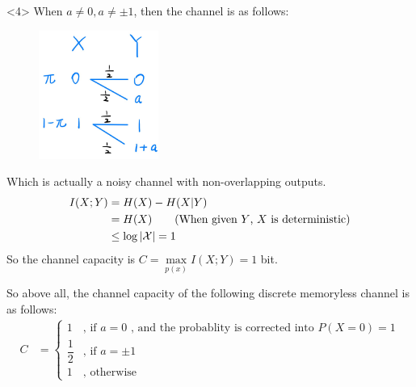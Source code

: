 <4> When $a \neq 0, a \neq \pm 1$, then the channel is as follows:
\begin{figure}[htbp]
    \centering
	\includegraphics[width=0.35\textwidth]{../figures/7.2_otherwise.png}
\end{figure}

Which is actually a noisy channel with non-overlapping outputs.
\begin{align*}
I(X;Y) &= H(X) - H(X|Y) \\
&= H(X) \text{\qquad (When given $Y$, $X$ is deterministic)} \\
&\leq \log \left|\mathcal{X}\right| = 1
\end{align*}
So the channel capacity is $C=\max\limits_{p(x)}I(X;Y)=1$ bit.

So above all, the channel capacity of the following discrete memoryless channel is as follows:
\begin{align*}
C &= \begin{cases}
1 & \text{, if } a=0 \text{ , and the probablity is corrected into } P(X=0)=1 \\
\dfrac{1}{2} & \text{, if } a=\pm 1 \\
1 & \text{, otherwise}
\end{cases}
\end{align*}

\newpage